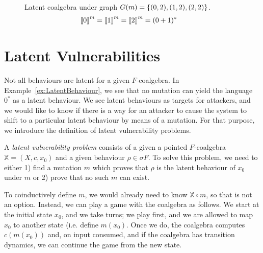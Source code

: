 \begin{example}
\begin{figure}[t]
\caption{Latent coalgebra under graph $G(m)=\left\{(0,2),(1,2),(2,2)\right\}$. 
\protect\begin{align*}
{{{\llbracket0\rrbracket}}^{m}}&={{{\llbracket1\rrbracket}}^{m}}={{{\llbracket2\rrbracket}}^{m}}=(0+1)^*
\protect\end{align*}
}
\label{fig:3.28}
\end{figure}

\end{example}

\section{Latent Vulnerabilities}
Not all behaviours are latent for a given $F$-coalgebra. In Example~\ref{ex:LatentBehaviour}, we see that no mutation can yield the language $0^*$ as a latent behaviour. We see latent behaviours as targets for attackers, and we would like to know if there is a way for an attacker to cause the system to shift to a particular latent behaviour by means of a mutation. For that purpose, we introduce the definition of {latent vulnerability problems}.

\begin{definition}
A \emph{latent vulnerability problem} consists of a given a pointed $F$-coalgebra $\mathbb{X}=(X,c,x_0)$ and a given behaviour $\rho\in \sigma F$. To solve this problem, we need to either 1) find a mutation $m$ which proves that $\rho$ is the latent behaviour of $x_0$ under $m$ or 2) prove that no such $m$ can exist.
\end{definition}

To coinductively define $m$, we would already need to know $\mathbb{X}\circ m$, so that is not an option. Instead, we can play a game with the coalgebra as follows. We start at the initial state $x_0$, and we take turns; we play first, and we are allowed to map $x_0$ to another state (i.e. define $m(x_0)$. Once we do, the coalgebra computes $c(m(x_0))$ and, on input consumed, and if the coalgebra has transition dynamics, we can continue the game from the new state.

